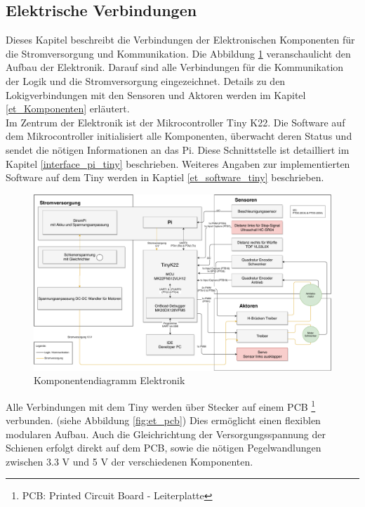 \documentclass[../../main.tex]{subfiles}
\begin{document}
    \subsection{Elektrische Verbindungen} \label{et_verbindungen}
    Dieses Kapitel beschreibt die Verbindungen der Elektronischen Komponenten für die Stromversorgung und Kommunikation. Die Abbildung \ref{fig:et_komponenten} veranschaulicht den Aufbau der Elektronik. Darauf sind alle Verbindungen für die Kommunikation der Logik und die Stromversorgung eingezeichnet. Details zu den Lokigverbindungen mit den Sensoren und Aktoren werden im Kapitel \ref{et_Komponenten} erläutert. \\
    Im Zentrum der Elektronik ist der Mikrocontroller Tiny K22. Die Software auf dem Mikrocontroller initialisiert alle Komponenten, überwacht deren Status und sendet die nötigen Informationen an das Pi. Diese Schnittstelle ist detailliert im Kapitel \ref{interface_pi_tiny} beschrieben. Weiteres Angaben zur implementierten Software auf dem Tiny werden in Kaptiel \ref{et_software_tiny} beschrieben.\\

    \begin{figure}[H]
        \centering
        \includegraphics[width=1.0\textwidth]{../../images/et/KomponentenDiagramm_ET.pdf}
        \caption {Komponentendiagramm Elektronik}
        \label{fig:et_komponenten}
    \end{figure}

    Alle Verbindungen mit dem Tiny werden über Stecker auf einem PCB \footnote{PCB: Printed Circuit Board - Leiterplatte} verbunden. (siehe Abbildung \ref{fig:et_pcb}) Dies ermöglicht einen flexiblen modularen Aufbau. Auch die Gleichrichtung der Versorgungsspannung der Schienen erfolgt direkt auf dem PCB, sowie die nötigen Pegelwandlungen zwischen 3.3 V und 5 V der verschiedenen Komponenten.\\
\end{document}
